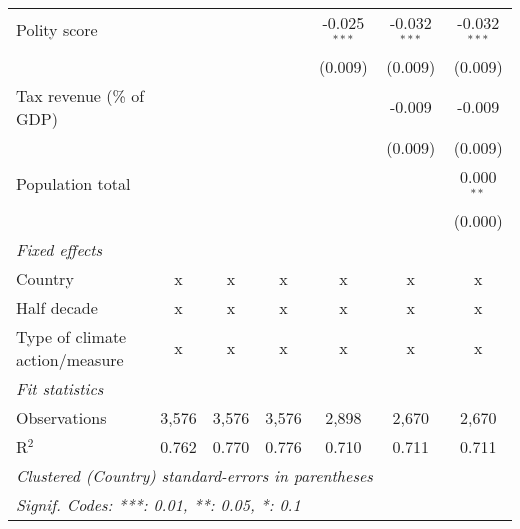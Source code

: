 \begin{tabular}{lcccccc}
   Polity score                                                             &         &               &                & -0.025$^{***}$ & -0.032$^{***}$ & -0.032$^{***}$\\   
                                                                            &         &               &                & (0.009)        & (0.009)        & (0.009)\\   
   Tax revenue (\% of GDP)                                                  &         &               &                &                & -0.009         & -0.009\\   
                                                                            &         &               &                &                & (0.009)        & (0.009)\\   
   Population total                                                         &         &               &                &                &                & 0.000$^{**}$\\   
                                                                            &         &               &                &                &                & (0.000)\\   
   \emph{Fixed effects}\\
   Country                                                                  & x       & x             & x              & x              & x              & x\\  
   Half decade                                                              & x       & x             & x              & x              & x              & x\\  
   Type of climate action/measure                                           & x       & x             & x              & x              & x              & x\\  
   \midrule \emph{Fit statistics}\\
   Observations                                                             & 3,576   & 3,576         & 3,576          & 2,898          & 2,670          & 2,670\\  
   R$^2$                                                                    & 0.762   & 0.770         & 0.776          & 0.710          & 0.711          & 0.711\\  
   \midrule
   \multicolumn{7}{l}{\emph{Clustered (Country) standard-errors in parentheses}}\\
   \multicolumn{7}{l}{\emph{Signif. Codes: ***: 0.01, **: 0.05, *: 0.1}}\\
\end{tabular}
\par\endgroup


